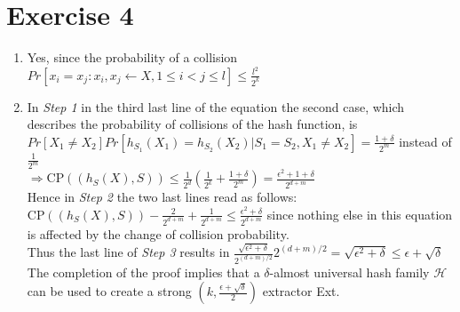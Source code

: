 \documentclass[11pt]{scrartcl}
\begin{document}
\section*{Exercise 4}
\begin{enumerate}
	\item %
	Yes, since the probability of a collision $Pr[x_i=x_j: x_i,x_j\leftarrow X, 1\leq i<j\leq l]\leq \frac{l^2}{2^k}$


	\item In \emph{Step 1} in the third last line of the equation the second case, which describes the probability of collisions of the hash function, is\\
	$Pr[X_1\neq X_2]Pr[h_{S_1}(X_1)=h_{S_2}(X_2)|S_1=S_2, X_1\neq X_2]=\frac{1+\delta}{2^m}$ instead of $\frac{1}{2^m}$\\
	$\Rightarrow \text{CP}((h_S(X),S))\leq \frac{1}{2^d}(\frac{1}{2^k}+\frac{1+\delta}{2^m}) = \frac{\epsilon^2 + 1 + \delta}{2^{d+m}}$\\

	Hence in \emph{Step 2} the two last lines read as follows:\\
	CP$((h_S(X),S))-\frac{2}{2^{d+m}}+\frac{1}{2^{d+m}} \leq \frac{\epsilon^2 + \delta}{2^{d+m}}$ since nothing else in this equation is affected by the change of collision probability.\\

	Thus the last line of \emph{Step 3} results in $\frac{\sqrt{\epsilon^2 + \delta}}{2^{(d+m)/2}}2^{(d+m)/2} = \sqrt{\epsilon^2 + \delta} \leq \epsilon + \sqrt{\delta}$\\

	The completion of the proof implies that a $\delta$-almost universal hash family $\mathcal{H}$ can be used to create a strong $(k,\frac{\epsilon + \sqrt{\delta}}{2})$ extractor Ext.
\end{enumerate}
\end{document}
